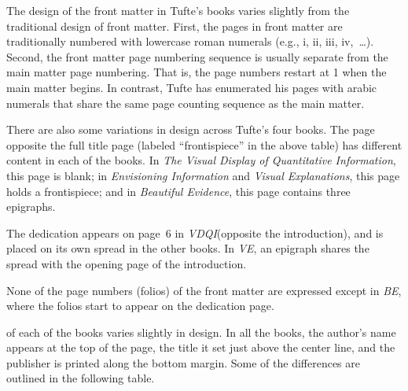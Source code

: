 \documentclass{tufte-book}
\theoremstyle{definition}
\newcommand{\vdqi}{\textit{VDQI}\xspace}
\newcommand{\ve}{\textit{VE}\xspace}
\newcommand{\be}{\textit{BE}\xspace}
\newcommand{\VDQI}{\textit{The Visual Display of Quantitative Information}\xspace}
\newcommand{\EI}{\textit{Envisioning Information}\xspace}
\newcommand{\VE}{\textit{Visual Explanations}\xspace}
\newcommand{\BE}{\textit{Beautiful Evidence}\xspace}
\begin{document}
\bigskip
The design of the front matter in Tufte's books varies slightly from the
traditional design of front matter.  First, the pages in front matter are
traditionally numbered with lowercase roman numerals (e.g., i, ii, iii,
iv,~\ldots).  Second, the front matter page numbering sequence is usually
separate from the main matter page numbering.  That is, the page numbers
restart at 1 when the main matter begins.  In contrast, Tufte has
enumerated his pages with arabic numerals that share the same page counting
sequence as the main matter.  

There are also some variations in design across Tufte's four books.  The
page opposite the full title page (labeled ``frontispiece'' in the above
table) has different content in each of the books.  In \VDQI, this page is
blank; in \EI and \VE, this page holds a frontispiece; and in \BE, this
page contains three epigraphs.

The dedication appears on page~6 in \vdqi (opposite the introduction), and
is placed on its own spread in the other books.  In \ve, an epigraph shares
the spread with the opening page of the introduction.

None of the page numbers (folios) of the front matter are expressed except in
\be, where the folios start to appear on the dedication page.

 of each of the books varies slightly in
design.  In all the books, the author's name appears at the top of the
page, the title it set just above the center line, and the publisher is
printed along the bottom margin.  Some of the differences are outlined in
the following table.
\end{document}
